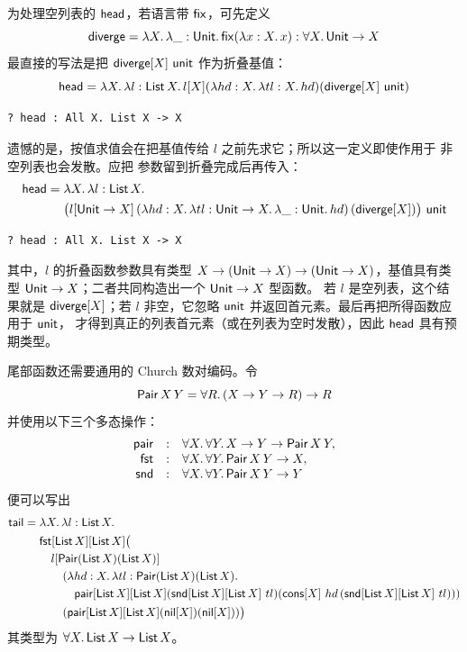 为处理空列表的 \(\mathsf{head}\)，若语言带 \(\mathsf{fix}\)，可先定义
\[
\mathsf{diverge}
=\lambda X.\,\lambda\_:\mathsf{Unit}.\,
 \mathsf{fix}(\lambda x:X.\,x)
:\forall X.\,\mathsf{Unit}\to X
\]
最直接的写法是把 \(\mathsf{diverge}[X]\ \mathsf{unit}\) 作为折叠基值：
\[
\mathsf{head}
=\lambda X.\,\lambda l:\mathsf{List}\,X.\,
l[X](\lambda hd:X.\,\lambda tl:X.\,hd)
     (\mathsf{diverge}[X]\ \mathsf{unit})
\]
\begin{lstlisting}
? head : All X. List X -> X
\end{lstlisting}
遗憾的是，按值求值会在把基值传给 \(l\) 之前先求它；所以这一定义即使作用于
非空列表也会发散。应把  参数留到折叠完成后再传入：
\[
\begin{aligned}
\mathsf{head}={}&
\lambda X.\,\lambda l:\mathsf{List}\,X.\\
&\bigl(l[\mathsf{Unit}\to X]\,
(\lambda hd:X.\,\lambda tl:\mathsf{Unit}\to X.\,
 \lambda\_:\mathsf{Unit}.\,hd)\,
(\mathsf{diverge}[X])\bigr)\ \mathsf{unit}
\end{aligned}
\]
\begin{lstlisting}
? head : All X. List X -> X
\end{lstlisting}
其中，\(l\) 的折叠函数参数具有类型
\(X\to(\mathsf{Unit}\to X)\to(\mathsf{Unit}\to X)\)，基值具有类型
\(\mathsf{Unit}\to X\)；二者共同构造出一个 \(\mathsf{Unit}\to X\) 型函数。
若 \(l\) 是空列表，这个结果就是 \(\mathsf{diverge}[X]\)；若 \(l\) 非空，它忽略
\(\mathsf{unit}\) 并返回首元素。最后再把所得函数应用于 \(\mathsf{unit}\)，
才得到真正的列表首元素（或在列表为空时发散），因此 \(\mathsf{head}\) 具有预期类型。

尾部函数还需要通用的 Church 数对编码。令
\[
\mathsf{Pair}\,X\,Y=\forall R.\,(X\to Y\to R)\to R
\]
并使用以下三个多态操作：
\[
\begin{array}{rcl}
\mathsf{pair}&:&\forall X.\,\forall Y.\,X\to Y\to\mathsf{Pair}\,X\,Y,\\
\mathsf{fst}&:&\forall X.\,\forall Y.\,\mathsf{Pair}\,X\,Y\to X,\\
\mathsf{snd}&:&\forall X.\,\forall Y.\,\mathsf{Pair}\,X\,Y\to Y
\end{array}
\]
便可以写出
\[
\begin{aligned}
\mathsf{tail}={}&\lambda X.\,\lambda l:\mathsf{List}\,X.\\
&\mathsf{fst}[\mathsf{List}\,X][\mathsf{List}\,X]\bigl(\\
&\quad l[\mathsf{Pair}(\mathsf{List}\,X)(\mathsf{List}\,X)]\\
&\qquad(\lambda hd:X.\,\lambda tl:\mathsf{Pair}(\mathsf{List}\,X)
                         (\mathsf{List}\,X).\\
&\qquad\quad\mathsf{pair}[\mathsf{List}\,X][\mathsf{List}\,X]
   (\mathsf{snd}[\mathsf{List}\,X][\mathsf{List}\,X]\ tl)
   (\mathsf{cons}[X]\ hd\,
    (\mathsf{snd}[\mathsf{List}\,X][\mathsf{List}\,X]\ tl)))\\
&\qquad(\mathsf{pair}[\mathsf{List}\,X][\mathsf{List}\,X]
   (\mathsf{nil}[X])(\mathsf{nil}[X]))\bigr)
\end{aligned}
\]
其类型为 \(\forall X.\,\mathsf{List}\,X\to\mathsf{List}\,X\)。

